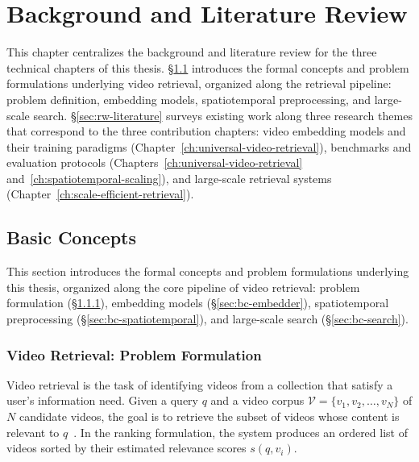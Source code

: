 \chapter{Background and Literature Review}
\label{ch:related-work}

This chapter centralizes the background and literature review for the three technical chapters of this thesis. \S\ref{sec:rw-concepts} introduces the formal concepts and problem formulations underlying video retrieval, organized along the retrieval pipeline: problem definition, embedding models, spatiotemporal preprocessing, and large-scale search. \S\ref{sec:rw-literature} surveys existing work along three research themes that correspond to the three contribution chapters: video embedding models and their training paradigms (Chapter~\ref{ch:universal-video-retrieval}), benchmarks and evaluation protocols (Chapters~\ref{ch:universal-video-retrieval} and~\ref{ch:spatiotemporal-scaling}), and large-scale retrieval systems (Chapter~\ref{ch:scale-efficient-retrieval}).

\section{Basic Concepts}
\label{sec:rw-concepts}

This section introduces the formal concepts and problem formulations underlying this thesis, organized along the core pipeline of video retrieval: problem formulation (\S\ref{sec:bc-vr}), embedding models (\S\ref{sec:bc-embedder}), spatiotemporal preprocessing (\S\ref{sec:bc-spatiotemporal}), and large-scale search (\S\ref{sec:bc-search}).

\subsection{Video Retrieval: Problem Formulation}
\label{sec:bc-vr}

Video retrieval is the task of identifying videos from a collection that satisfy a user's information need. Given a query $q$ and a video corpus $\mathcal{V} = \{v_1, v_2, \ldots, v_N\}$ of $N$ candidate videos, the goal is to retrieve the subset of videos whose content is relevant to $q$~\citep{zhu2023deep}. In the ranking formulation, the system produces an ordered list of videos sorted by their estimated relevance scores $s(q, v_i)$.

